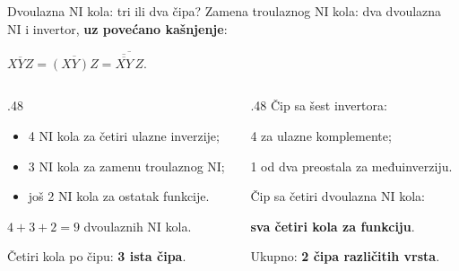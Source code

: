 \begin{frame}[label=02-s048b]{Dvoulazna NI kola: tri ili dva čipa?}
\setlength{\parskip}{0pt}
Zamena troulaznog NI kola: dva dvoulazna NI i invertor, \alert{\textbf{uz povećano kašnjenje}}:
\par\vspace{2mm}
{\centering\(\displaystyle\overline{XYZ}=\overline{(XY)Z}
=\overline{\overline{\overline{XY}}\,Z}.\)\par}
\vspace{2mm}
\begin{columns}[T,onlytextwidth]
\begin{column}{.48\textwidth}
\begin{itemize}
\setlength{\itemsep}{1pt}\setlength{\parsep}{0pt}
\item 4 NI kola za četiri ulazne inverzije;
\item 3 NI kola za zamenu troulaznog NI;
\item još 2 NI kola za ostatak funkcije.
\end{itemize}
\(4+3+2=9\) dvoulaznih NI kola.\par
Četiri kola po čipu: \textbf{3 ista čipa}.
\end{column}
\begin{column}{.48\textwidth}
Čip sa šest invertora:\par
4 za ulazne komplemente;\par
1 od dva preostala za međuinverziju.
\par\vspace{1.5mm}
Čip sa četiri dvoulazna NI kola:\par
\textbf{sva četiri kola za funkciju}.
\par\vspace{1.5mm}
Ukupno: \textbf{2 čipa različitih vrsta}.
\end{column}
\end{columns}
\par\vspace{2mm}
\end{frame}

